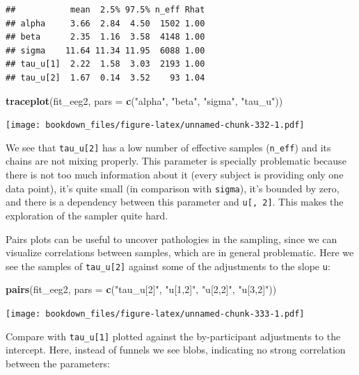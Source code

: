 \documentclass[12pt,]{krantz}
\newenvironment{Shaded}{\begin{snugshade}}{\end{snugshade}}
\newcommand{\KeywordTok}[1]{\textcolor[rgb]{0.13,0.29,0.53}{\textbf{#1}}}
\newcommand{\DataTypeTok}[1]{\textcolor[rgb]{0.13,0.29,0.53}{#1}}
\newcommand{\StringTok}[1]{\textcolor[rgb]{0.31,0.60,0.02}{#1}}
\newcommand{\NormalTok}[1]{#1}
\theoremstyle{definition}
\theoremstyle{definition}
\theoremstyle{definition}
\theoremstyle{remark}
\begin{document}
\begin{verbatim}
##           mean  2.5% 97.5% n_eff Rhat
## alpha     3.66  2.84  4.50  1502 1.00
## beta      2.35  1.16  3.58  4148 1.00
## sigma    11.64 11.34 11.95  6088 1.00
## tau_u[1]  2.22  1.58  3.03  2193 1.00
## tau_u[2]  1.67  0.14  3.52    93 1.04
\end{verbatim}

\begin{Shaded}
\begin{Highlighting}[]
\KeywordTok{traceplot}\NormalTok{(fit_eeg2, }\DataTypeTok{pars =} \KeywordTok{c}\NormalTok{(}\StringTok{"alpha"}\NormalTok{, }\StringTok{"beta"}\NormalTok{, }\StringTok{"sigma"}\NormalTok{, }\StringTok{"tau_u"}\NormalTok{))}
\end{Highlighting}
\end{Shaded}

\texttt{[image: bookdown\_files/figure-latex/unnamed-chunk-332-1.pdf]}

We see that \texttt{tau\_u{[}2{]}} has a low number of effective samples
(\texttt{n\_eff}) and its chains are not mixing properly. This parameter
is specially problematic because there is not too much information about
it (every subject is providing only one data point), it's quite small
(in comparison with \texttt{sigma}), it's bounded by zero, and there is
a dependency between this parameter and \texttt{u{[},\ 2{]}}. This makes
the exploration of the sampler quite hard.

Pairs plots can be useful to uncover pathologies in the sampling, since
we can visualize correlations between samples, which are in general
problematic. Here we see the samples of \texttt{tau\_u{[}2{]}} against
some of the adjustments to the slope \texttt{u}:

\begin{Shaded}
\begin{Highlighting}[]
\KeywordTok{pairs}\NormalTok{(fit_eeg2, }\DataTypeTok{pars =} \KeywordTok{c}\NormalTok{(}\StringTok{"tau_u[2]"}\NormalTok{, }\StringTok{"u[1,2]"}\NormalTok{, }\StringTok{"u[2,2]"}\NormalTok{, }\StringTok{"u[3,2]"}\NormalTok{))}
\end{Highlighting}
\end{Shaded}

\texttt{[image: bookdown\_files/figure-latex/unnamed-chunk-333-1.pdf]}

Compare with \texttt{tau\_u{[}1{]}} plotted against the by-participant
adjustments to the intercept. Here, instead of funnels we see blobs,
indicating no strong correlation between the parameters:
\end{document}
